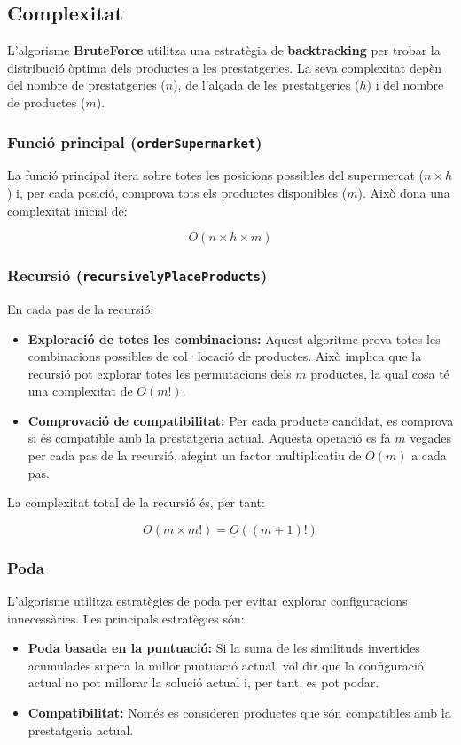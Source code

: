 \documentclass[a4paper,12pt]{report}
\begin{document}
\subsection{Complexitat}
L'algorisme \textbf{BruteForce} utilitza una estratègia de \textbf{backtracking} per trobar la distribució òptima dels productes a les prestatgeries. La seva complexitat depèn del nombre de prestatgeries (\(n\)), de l'alçada de les prestatgeries (\(h\)) i del nombre de productes (\(m\)).

\subsubsection{Funció principal (\texttt{orderSupermarket})}

La funció principal itera sobre totes les posicions possibles del supermercat (\(n \times h\)) i, per cada posició, comprova tots els productes disponibles (\(m\)). Això dona una complexitat inicial de:

\[
O(n \times h \times m)
\]

\subsubsection{Recursió (\texttt{recursivelyPlaceProducts})}

En cada pas de la recursió:
\begin{itemize}
    \item \textbf{Exploració de totes les combinacions:} Aquest algoritme prova totes les combinacions possibles de col·locació de productes. Això implica que la recursió pot explorar totes les permutacions dels \(m\) productes, la qual cosa té una complexitat de \(O(m!)\).
    \item \textbf{Comprovació de compatibilitat:} Per cada producte candidat, es comprova si és compatible amb la prestatgeria actual. Aquesta operació es fa \(m\) vegades per cada pas de la recursió, afegint un factor multiplicatiu de \(O(m)\) a cada pas.
\end{itemize}

La complexitat total de la recursió és, per tant:

\[
O(m \times m!) = O((m+1)!)
\]

\subsubsection{Poda}

L'algorisme utilitza estratègies de poda per evitar explorar configuracions innecessàries. Les principals estratègies són:
\begin{itemize}
    \item \textbf{Poda basada en la puntuació:} Si la suma de les similituds invertides acumulades supera la millor puntuació actual, vol dir que la configuració actual no pot millorar la solució actual i, per tant, es pot podar.
    \item \textbf{Compatibilitat:} Només es consideren productes que són compatibles amb la prestatgeria actual.
\end{itemize}
\end{document}
